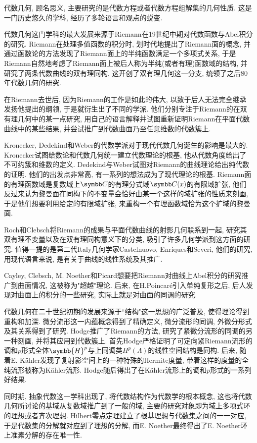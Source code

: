 代数几何, 顾名思义, 主要研究的是代数方程或者代数方程组解集的几何性质. 这是一门历史悠久的学科, 经历了多轮语言和观点的蜕变.

代数几何这门学科的最大发展来源于Riemann在19世纪中期对代数函数与Abel积分的研究. Riemann在处理多值函数的积分时, 划时代地提出了Riemann面的概念, 并通过函数论的方法发现了Riemann面上的半纯函数满足一个多项式关系, 于是Riemann自然地考虑了Riemann面上被后人称为半纯(或者有理)函数域的结构, 并研究了两条代数曲线的双有理同构, 这开创了双有理几何这一分支, 统领了之后80年代数几何的研究.

在Riemann去世后, 因为Riemann的工作是如此的伟大, 以致于后人无法完全继承发扬他提出的纲领, 于是就衍生出了不同的学派. 他们分别专注于Riemann的在双有理几何中的某一点研究, 用自己的语言解释并试图重新证明Riemann在平面代数曲线中的某些结果, 并尝试推广到代数曲面乃至任意维数的代数簇上.

Kronecker, Dedekind和Weber的代数学派对于现代代数几何诞生的影响是最大的. Kronecker试图给数论和代数几何统一建立代数理论的根基, 他从代数角度给出了不可约簇和维数的定义. Dedekind与Weber试图对Riemann的曲线理论给出纯代数的证明. 他们的出发点非常高, 有一系列的想法成为了现代理论的根基. Riemann面的有理函数域是复数域上$\BC$的有理分式域$\BC(x)$的有限域扩张, 他们反过来认为黎曼面在同构下的不变量会恰好由某一个这样的域扩张的性质来刻画, 于是他们想要利用给定的有限域扩张, 来重构一个有理函数域恰为这个扩域的黎曼面.

Roch和Clebsch将Riemann的成果与平面代数曲线的射影几何联系到一起, 研究其双有理不变量以及在双有理同构意义下的分类, 吸引了许多几何学派到这方面的研究. 值得一提的是第二代Italy几何学家Castelnuovo, Enriques和Severi, 他们的研究, 用现代语言来说, 是有关于曲线的线性系统及其推广.

Cayley, Clebsch, M. Noether和Picard想要把Riemann对曲线上Abel积分的研究推广到曲面情况, 这被称为"超越"理论. 后来, 在H.Poincar\'e引入单纯复形之后, 后人发现对曲面上的积分的一些研究, 实际上就是对曲面的同调的研究.

代数几何在二十世纪初期的发展来源于``结构"这一思想的广泛普及, 使得理论得到重构和加深. 微分流形这一内蕴概念得到了精确定义, 微分流形的同调, 外微分形式及其关系得到了研究. Hodge推广了Riemann的方法, 研究了紧微分流形的同调的另一种刻画, 并将其应用到代数簇上. 首先Hodge严格证明了可定向紧Riemann流形的调和$p$形式全体$\symbb{H}^p$与上同调类$H^p(\Lambda)$的线性空间结构是同构. 后来, 随着E. K\"ahler发现了复射影空间上的一种特殊的Hermite度量, 带着这样的度量的全纯流形被称为K\"ahler流形. Hodge随后得出了在K\"ahler流形上的调和$p$形式的一系列好结果.

同时期, 抽象代数这一学科出现了, 将代数结构作为代数学的根本概念, 这也将代数几何所讨论的基域从复数域推广到了一般的域, 主要的研究对象即为域上多项式环的理想或者齐次理想. Hilbert零点定理建立了根基理想与代数集之间的一一对应, 于是代数集的分解就对应到了理想的分解, 而E. Noether最终得出了E. Noether环上准素分解的存在唯一性.

